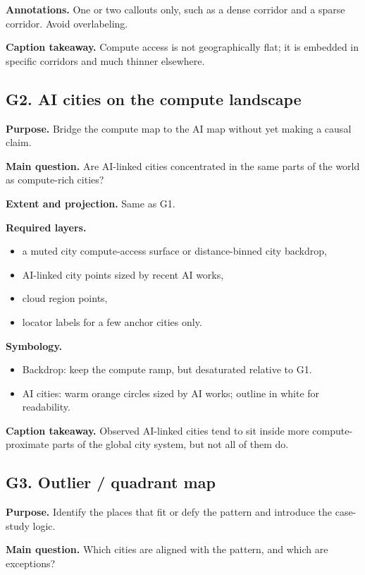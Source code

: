 \documentclass[11pt]{article}
\begin{document}
\textbf{Annotations.} One or two callouts only, such as a dense corridor and a sparse corridor. Avoid overlabeling.

\textbf{Caption takeaway.} Compute access is not geographically flat; it is embedded in specific corridors and much thinner elsewhere.

\subsection{G2. AI cities on the compute landscape}
\textbf{Purpose.} Bridge the compute map to the AI map without yet making a causal claim.

\textbf{Main question.} Are AI-linked cities concentrated in the same parts of the world as compute-rich cities?

\textbf{Extent and projection.} Same as G1.

\textbf{Required layers.}
\begin{itemize}[leftmargin=1.4em,itemsep=0.2em]
    \item a muted city compute-access surface or distance-binned city backdrop,
    \item AI-linked city points sized by recent AI works,
    \item cloud region points,
    \item locator labels for a few anchor cities only.
\end{itemize}

\textbf{Symbology.}
\begin{itemize}[leftmargin=1.4em,itemsep=0.2em]
    \item Backdrop: keep the compute ramp, but desaturated relative to G1.
    \item AI cities: warm orange circles sized by AI works; outline in white for readability.
\end{itemize}

\textbf{Caption takeaway.} Observed AI-linked cities tend to sit inside more compute-proximate parts of the global city system, but not all of them do.

\subsection{G3. Outlier / quadrant map}
\textbf{Purpose.} Identify the places that fit or defy the pattern and introduce the case-study logic.

\textbf{Main question.} Which cities are aligned with the pattern, and which are exceptions?
\end{document}
